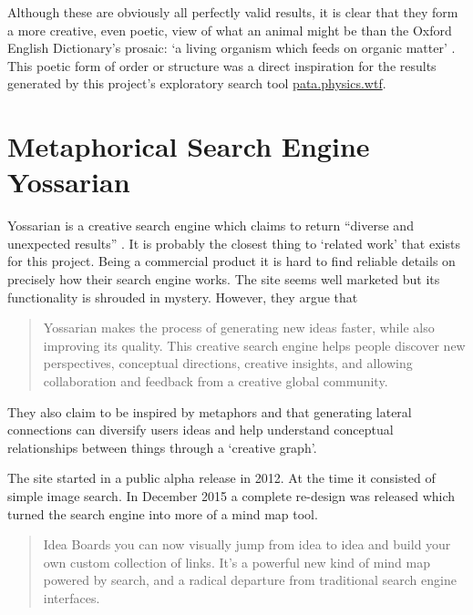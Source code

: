 Although these are obviously all perfectly valid results, it is clear that they form a more creative, even poetic, view of what an animal might be than the Oxford English Dictionary's prosaic: `a living organism which feeds on organic matter' \citeyear{OEDanimal}. This poetic form of order or structure was a direct inspiration for the results generated by this project's exploratory search tool \url{pata.physics.wtf}.


\section{Metaphorical Search Engine Yossarian}
\label{s:yossarian}

Yossarian is a creative search engine which claims to return ``diverse and unexpected results'' \citeyear{Yossarian2015}. It is probably the closest thing to `related work' that exists for this project. Being a commercial product it is hard to find reliable details on precisely how their search engine works. The site seems well marketed but its functionality is shrouded in mystery. However, they argue that

\begin{quotation}
  Yossarian makes the process of generating new ideas faster, while also improving its quality. This creative search engine helps people discover new perspectives, conceptual directions, creative insights, and allowing collaboration and feedback from a creative global community. 
\end{quotation}

They also claim to be inspired by metaphors and that generating lateral connections can diversify users ideas and help understand conceptual relationships between things through a `creative graph'.

The site started in a public alpha release in 2012. At the time it consisted of simple image search. In December 2015 a complete re-design was released \autocite{YossarianEmail} which turned the search engine into more of a mind map tool.

\begin{quotation}
  Idea Boards you can now visually jump from idea to idea and build your own custom collection of links. It's a powerful new kind of mind map powered by search, and a radical departure from traditional search engine interfaces. 
\end{quotation}

